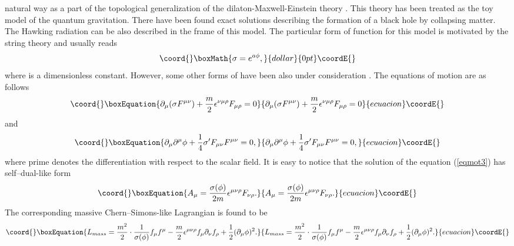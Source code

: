 \documentclass[a4 paper, 12 pt] {article}
\begin{document}
natural way as a part of the topological generalization of the
\coordHE{} dilaton-Maxwell-Einstein theory \cite{dilaton}. This
theory has been treated as the toy model of the quantum
gravitation. There have been found exact solutions describing the
formation of a black hole by collapsing matter. The Hawking
radiation can be also described in the frame of this model. The
particular form of \myHighlight{$\sigma $}\coordHE{} function for this model is
motivated by the string theory and usually reads
$$\coord{}\boxMath{\sigma = e^{a \phi }, }{dollar}{0pt}\coordE{}$$ where \coordHE{} is a dimensionless constant.
However, some other forms of \myHighlight{$\sigma $}\coordHE{} have been also under
consideration \cite{dilatoninne}.
\newline
The equations of motion are as follows
\begin{equation}\coord{}\boxEquation{
\partial_{\mu } (\sigma  F^{\mu \nu }) +\frac{m}{2} \epsilon^{\nu \mu \rho}
F_{\mu \rho}=0
\label{eqmot3}
}{
\partial_{\mu } (\sigma  F^{\mu \nu }) +\frac{m}{2} \epsilon^{\nu \mu \rho}
F_{\mu \rho}=0
}{ecuacion}\coordE{}\end{equation}
and
\begin{equation}\coord{}\boxEquation{
\partial_{\mu } \partial^{\mu } \phi + \frac{1}{4} \sigma' F_{\mu \nu } F^{\mu \nu
}=0,
\label{eqmot4}
}{
\partial_{\mu } \partial^{\mu } \phi + \frac{1}{4} \sigma' F_{\mu \nu } F^{\mu \nu
}=0,
}{ecuacion}\coordE{}\end{equation}
where prime denotes the differentiation with respect to the scalar field.
It is easy to notice that the solution of the equation (\ref{eqmot3}) has
self--dual-like form
\begin{equation}\coord{}\boxEquation{
A_{\mu }= \frac{\sigma (\phi ) }{2m} \epsilon^{\mu \nu \rho} F_{\nu \rho
}.
\label{selfdualdyl}
}{
A_{\mu }= \frac{\sigma (\phi ) }{2m} \epsilon^{\mu \nu \rho} F_{\nu \rho
}.
}{ecuacion}\coordE{}\end{equation}
The corresponding massive Chern--Simons-like Lagrangian is found to be
\begin{equation}\coord{}\boxEquation{
L_{mass} =\frac{m^2}{2} \cdot \frac{1}{\sigma (\phi )} f_{\mu } f^{\mu }
-\frac{m}{2} \epsilon^{\mu \nu \rho } f_{\mu } \partial_{\nu } f_{\rho}
+\frac{1}{2} (\partial_{\mu } \phi )^2.
\label{dylatondual}
}{
L_{mass} =\frac{m^2}{2} \cdot \frac{1}{\sigma (\phi )} f_{\mu } f^{\mu }
-\frac{m}{2} \epsilon^{\mu \nu \rho } f_{\mu } \partial_{\nu } f_{\rho}
+\frac{1}{2} (\partial_{\mu } \phi )^2.
}{ecuacion}\coordE{}\end{equation}
\end{document}
